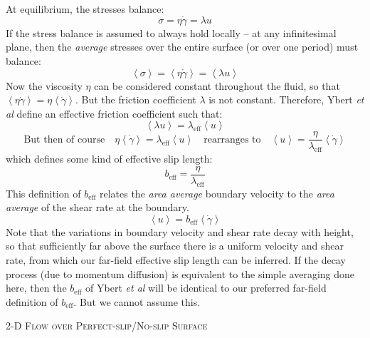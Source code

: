 \documentclass[12pt, a4paper, twoside, openright]{book}
\newcommand{\beff}{\ensuremath{b_{\mathrm{eff}}}}
\begin{document}
At equilibrium, the stresses balance:
\begin{equation}
\sigma = \eta \dot{\gamma} = \lambda u
\end{equation}
If the stress balance is assumed to always hold locally -- at any infinitesimal plane, then the \emph{average} stresses over the entire surface (or over one period) must balance:
\begin{equation}
\left< \sigma \right> = \left< \eta \dot{\gamma} \right> = \left< \lambda u \right>
\end{equation}
Now the viscosity $\eta$ can be considered constant throughout the fluid, so that $  \left< \eta \dot{\gamma} \right> = \eta \left< \dot{\gamma} \right> $.  But the friction coefficient $\lambda$ is not constant.  Therefore, Ybert \emph{et al} define an effective friction coefficient such that:
\begin{equation}
\left< \lambda u \right> = \lambda_{\mathrm{eff}} \left< u \right>
\end{equation}
\begin{equation}
\text{But then of course} \quad
\eta \left< \dot{\gamma} \right> = \lambda_{\mathrm{eff}} \left< u \right>
\quad \text{rearranges to}  \quad
\left< u \right> = \frac{\eta}{ \lambda_{\mathrm{eff}} } \left< \dot{\gamma} \right> 
\end{equation}
which defines some kind of effective slip length:
\begin{equation}
\beff = \frac{\eta}{ \lambda_{\mathrm{eff}} }  
\end{equation}
This definition of $\beff$ relates the \emph{area average} boundary velocity to the \emph{area average} of the shear rate at the boundary.
\begin{equation}
\left< u \right> = \beff \left< \dot{\gamma} \right> 
\end{equation}
Note that the variations in boundary velocity and shear rate decay with height, so that sufficiently far above the surface there is a uniform velocity and shear rate, from which our far-field effective slip length can be inferred.   If the decay process (due to momentum diffusion) is equivalent to the simple averaging done here, then the $\beff$ of Ybert \emph{et al} will be identical to our preferred far-field definition of $\beff$.  But we cannot assume this.

\vspace*{1em}
\colorbox[gray]{0.8}{ \textsc{2-D Flow over Perfect-slip/No-slip Surface} }
\vspace{0.5em}
\end{document}
